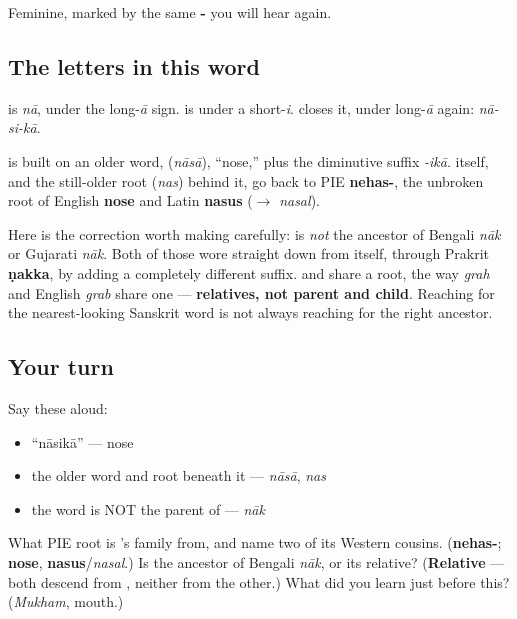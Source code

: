 Feminine, marked by the same \textbf{-} you will hear again.

\subsection*{The letters in this word}
\textbf{} is \emph{nā}, \textbf{} under the long-\emph{ā} sign. \textbf{} is \textbf{} under a short-\emph{i}. \textbf{} closes it, \textbf{} under long-\emph{ā} again: \emph{nā-si-kā}.

\begin{cousinweb}
\textbf{} is built on an older word, \textbf{} (\emph{nāsā}), \textquotedblleft{}nose,\textquotedblright{} plus the diminutive suffix \emph{-ikā}. \textbf{} itself, and the still-older root \textbf{} (\emph{nas}) behind it, go back to PIE \textbf{nehas-}, the unbroken root of English \textbf{nose} and Latin \textbf{nasus} ($\to$ \emph{nasal}).

Here is the correction worth making carefully: \textbf{} is \emph{not} the ancestor of Bengali \emph{nāk} or Gujarati \emph{nāk}. Both of those wore straight down from \textbf{} itself, through Prakrit \textbf{ṇakka}, by adding a completely different suffix.  and  share a root, the way \emph{grah} and English \emph{grab} share one — \textbf{relatives, not parent and child}. Reaching for the nearest-looking Sanskrit word is not always reaching for the right ancestor.
\end{cousinweb}

\subsection*{Your turn}
Say these aloud:

\begin{itemize}
\raggedright
  \item \textquotedblleft{}nāsikā\textquotedblright{} — nose
  \item the older word and root beneath it — \emph{nāsā}, \emph{nas}
  \item the word  is NOT the parent of — \emph{nāk}
\end{itemize}

\begin{tcolorbox}[breakable,colback=teal!4,colframe=teal!35!black,title={Before you move on}]
What PIE root is 's family from, and name two of its Western cousins. (\textbf{nehas-}; \textbf{nose}, \textbf{nasus}/\emph{nasal}.) Is  the ancestor of Bengali \emph{nāk}, or its relative? (\textbf{Relative} — both descend from , neither from the other.) What did you learn just before this? (\emph{Mukham}, mouth.)
\end{tcolorbox}
